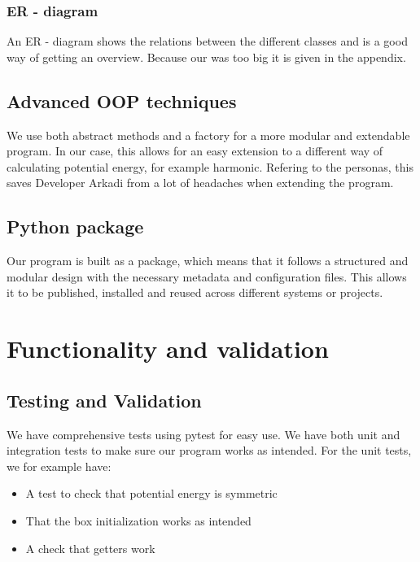 \documentclass{article}
\begin{document}
\subsubsection*{ER - diagram}

An ER - diagram shows the relations between the different classes and is a good way of getting an overview. Because our was too big it is given in the appendix.
\subsection*{Advanced OOP techniques}

We use both abstract methods and a factory for a more modular and extendable program. In our case, this allows for an easy extension to a different way of calculating potential energy, for example harmonic. Refering to the personas, this saves Developer Arkadi from a lot of headaches when extending the program.

\subsection*{Python package}

Our program is built as a package, which means that it follows a structured and modular design with the necessary metadata and configuration files. This allows it to be published, installed and reused across different systems or projects.

\section{Functionality and validation}

\subsection*{Testing and Validation}

We have comprehensive tests using pytest for easy use. We have both unit and integration tests to make sure our program works as intended. For the unit tests, we for example have:

\begin{itemize}
    \item A test to check that potential energy is symmetric
    \item That the box initialization works as intended
    \item A check that getters work
\end{itemize}
\end{document}
